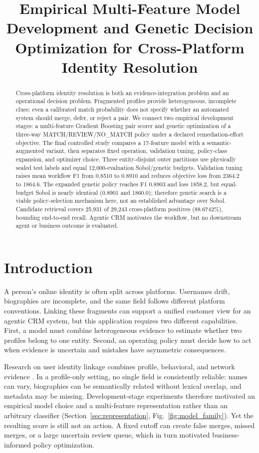 \documentclass[conference]{IEEEtran}
\title{Empirical Multi-Feature Model Development and Genetic Decision Optimization for Cross-Platform Identity Resolution}
\author{\IEEEauthorblockN{Anonymous Submission}}
\begin{document}
\maketitle

\begin{abstract}
Cross-platform identity resolution is both an evidence-integration problem and an operational decision problem. Fragmented profiles provide heterogeneous, incomplete clues; even a calibrated match probability does not specify whether an automated system should merge, defer, or reject a pair. We connect two empirical development stages: a multi-feature Gradient Boosting pair scorer and genetic optimization of a three-way MATCH/REVIEW/NO\_MATCH policy under a declared remediation-effort objective. The final controlled study compares a 17-feature model with a semantic-augmented variant, then separates fixed operation, validation tuning, policy-class expansion, and optimizer choice. Three entity-disjoint outer partitions use physically sealed test labels and equal 12,000-evaluation Sobol/genetic budgets. Validation tuning raises mean workflow F1 from 0.8510 to 0.8910 and reduces objective loss from 2364.2 to 1864.6. The expanded genetic policy reaches F1 0.8903 and loss 1858.2, but equal-budget Sobol is nearly identical (0.8901 and 1860.0); therefore genetic search is a viable policy-selection mechanism here, not an established advantage over Sobol. Candidate retrieval covers 25,931 of 29,243 cross-platform positives (88.6742\%), bounding end-to-end recall. Agentic CRM motivates the workflow, but no downstream agent or business outcome is evaluated.
\end{abstract}

\section{Introduction}
A person's online identity is often split across platforms. Usernames drift, biographies are incomplete, and the same field follows different platform conventions. Linking these fragments can support a unified customer view for an agentic CRM system, but this application requires two different capabilities. First, a model must combine heterogeneous evidence to estimate whether two profiles belong to one entity. Second, an operating policy must decide how to act when evidence is uncertain and mistakes have asymmetric consequences.

Research on user identity linkage combines profile, behavioral, and network evidence \cite{shu2017uilreview,linkSocial2018,yao2023profile}. In a profile-only setting, no single field is consistently reliable: names can vary, biographies can be semantically related without lexical overlap, and metadata may be missing. Development-stage experiments therefore motivated an empirical model choice and a multi-feature representation rather than an arbitrary classifier (Section~\ref{sec:representation}, Fig.~\ref{fig:model_family}). Yet the resulting score is still not an action. A fixed cutoff can create false merges, missed merges, or a large uncertain review queue, which in turn motivated business-informed policy optimization.
\end{document}
